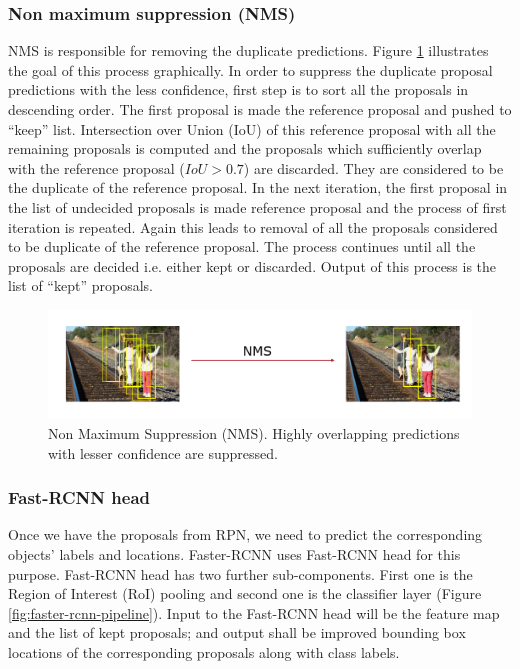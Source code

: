 \vspace{5pt}
\subsubsection{Non maximum suppression (NMS)}
NMS is responsible for removing the duplicate predictions. Figure \ref{fig:nms} illustrates the goal of this process graphically. In order to suppress the duplicate proposal predictions with the less confidence, first step is to sort all the proposals in descending order. The first proposal is made  the reference proposal and pushed to ``keep'' list. Intersection over Union (IoU) of this reference proposal with all the remaining proposals is computed and the proposals which sufficiently overlap with the reference proposal ($IoU > 0.7$) are discarded. They are considered to be the duplicate of the reference proposal. In the next iteration, the first proposal in the list of undecided proposals is made reference proposal and the process of first iteration is repeated. Again this leads to removal of all the proposals considered to be duplicate of the reference proposal. The process continues until all the proposals are decided i.e. either kept or discarded. Output of this process is the list of ``kept'' proposals. 

\begin{figure}
    \centering
    \includegraphics[width=\linewidth]{images/nms.PNG}
    \caption[Non Maximum Suppression (NMS)]{Non Maximum Suppression (NMS). Highly overlapping predictions with lesser confidence are suppressed.}
    \label{fig:nms}
\end{figure}

\vspace{5pt}
\subsubsection{Fast-RCNN head}
Once we have the proposals from RPN, we need to predict the corresponding objects' labels and locations. Faster-RCNN uses Fast-RCNN head\cite{ref_fastrcnn} for this purpose. Fast-RCNN head has two further sub-components. First one is the Region of Interest (RoI) pooling and second one is the classifier layer (Figure \ref{fig:faster-rcnn-pipeline}). Input to the Fast-RCNN head will be the feature map and the list of kept proposals; and output shall be improved bounding box locations of the corresponding proposals along with class labels. 

